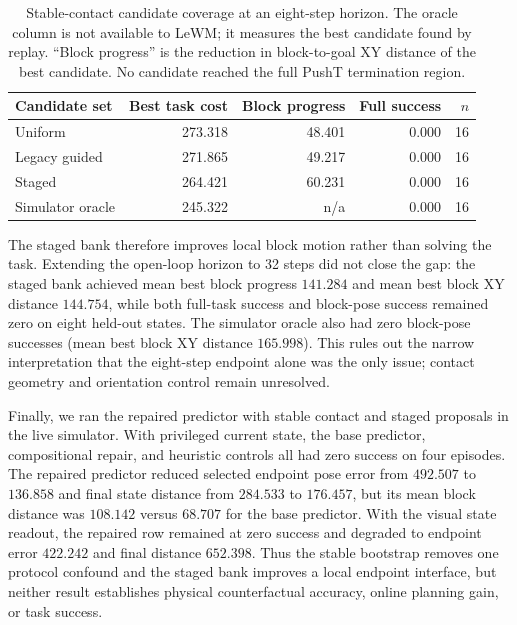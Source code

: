 \documentclass{article}
\begin{document}
\begin{table}[H]
\centering
\scriptsize
\setlength{\tabcolsep}{4pt}
\caption{Stable-contact candidate coverage at an eight-step horizon. The
oracle column is not available to LeWM; it measures the best candidate found
by replay. ``Block progress'' is the reduction in block-to-goal XY distance
of the best candidate. No candidate reached the full PushT termination
region.}
\label{tab:supp-staged-coverage}
\begin{tabular}{lrrrr}
\toprule
Candidate set & Best task cost & Block progress & Full success & $n$ \\
\midrule
Uniform & 273.318 & 48.401 & 0.000 & 16 \\
Legacy guided & 271.865 & 49.217 & 0.000 & 16 \\
Staged & 264.421 & 60.231 & 0.000 & 16 \\
Simulator oracle & 245.322 & n/a & 0.000 & 16 \\
\bottomrule
\end{tabular}
\end{table}

The staged bank therefore improves local block motion rather than solving the
task.  Extending the open-loop horizon to 32 steps did not close the gap:
the staged bank achieved mean best block progress $141.284$ and mean best
block XY distance $144.754$, while both full-task success and block-pose
success remained zero on eight held-out states.  The simulator oracle also
had zero block-pose successes (mean best block XY distance $165.998$).  This
rules out the narrow interpretation that the eight-step endpoint alone was
the only issue; contact geometry and orientation control remain unresolved.

Finally, we ran the repaired predictor with stable contact and staged
proposals in the live simulator. With privileged current state, the base
predictor, compositional repair, and heuristic controls all had zero success
on four episodes. The repaired predictor reduced selected endpoint pose error
from $492.507$ to $136.858$ and final state distance from $284.533$ to
$176.457$, but its mean block distance was $108.142$ versus $68.707$ for the
base predictor. With the visual state readout, the repaired row remained at
zero success and degraded to endpoint error $422.242$ and final distance
$652.398$. Thus the stable bootstrap removes one protocol confound and the
staged bank improves a local endpoint interface, but neither result
establishes physical counterfactual accuracy, online planning gain, or task
success.
\end{document}
